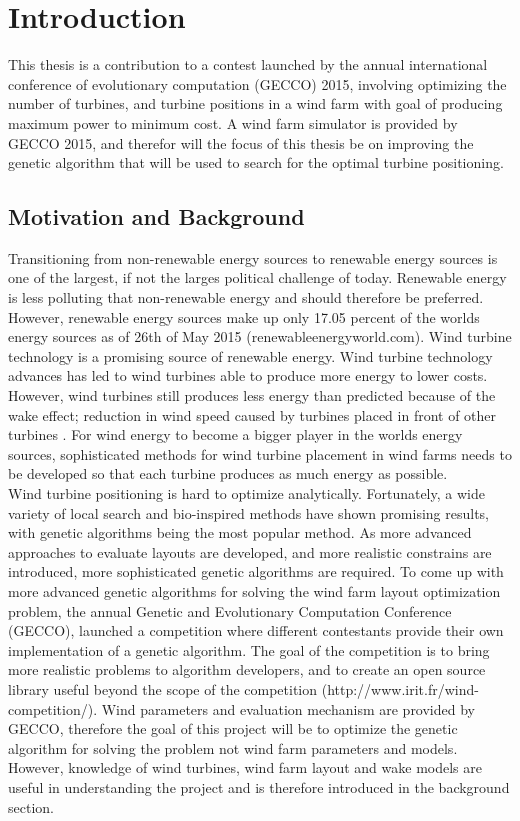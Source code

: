 \chapter{Introduction}
This thesis is a contribution to a contest launched by the annual international conference of evolutionary computation (GECCO) 2015, involving optimizing the number of turbines, and turbine positions in a wind farm with goal of producing maximum power to minimum cost. A wind farm simulator is provided by GECCO 2015, and therefor will the focus of this thesis be on improving the genetic algorithm that will be used to search for the optimal turbine positioning.


\section{Motivation and Background}
Transitioning from non-renewable energy sources to renewable energy sources is one of the largest, if not the larges political challenge of today. Renewable energy is less polluting that non-renewable energy and should therefore be preferred. However, renewable energy sources make up only 17.05 percent of the worlds energy sources as of 26th of May 2015 (renewableenergyworld.com). Wind turbine technology is a promising source of renewable energy. Wind turbine technology advances has led to wind turbines able to produce more energy to lower costs. However, wind turbines still produces less energy than predicted because of the wake effect; reduction in wind speed caused by turbines placed in front of other turbines \citep{Samorani}. For wind energy to become a bigger player in the worlds energy sources, sophisticated methods for wind turbine placement in wind farms needs to be developed so that each turbine produces as much energy as possible. \\

\noindent Wind turbine positioning is hard to optimize analytically. Fortunately, a wide variety of local search and bio-inspired methods have shown promising results, with genetic algorithms being the most popular method. As more advanced approaches to evaluate layouts are developed, and more realistic constrains are introduced, more sophisticated genetic algorithms are required. To come up with more advanced genetic algorithms for solving the wind farm layout optimization problem, the annual Genetic and Evolutionary Computation Conference (GECCO), launched a competition where different contestants provide their own implementation of a genetic algorithm. The goal of the competition is to bring more realistic problems to algorithm developers, and to create an open source library useful beyond the scope of the competition (http://www.irit.fr/wind-competition/). Wind parameters and evaluation mechanism are provided by GECCO, therefore the goal of this project will be to optimize the genetic algorithm for solving the problem not wind farm parameters and models. However, knowledge of wind turbines, wind farm layout and wake models are useful in understanding the project and is therefore introduced in the background section. \\

